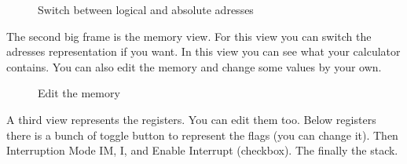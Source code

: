 \documentclass[10pt]{report}
\begin{document}
\begin{figure}[H]
\centering
{}
\caption{Switch between logical and absolute adresses}
\end{figure}
The second big frame is the memory view.\newline
For this view you can switch the adresses representation if you want.\newline
In this view you can see what your calculator contains.\newline
You can also edit the memory and change some values by your own.\newline
\begin{figure}[H]
\centering
{}
\caption{Edit the memory}
\end{figure}
A third view represents the registers.\newline
You can edit them too.\newline
Below registers there is a bunch of toggle button to represent the flags (you can change it).\newline
Then Interruption Mode IM, I, and Enable Interrupt (checkbox).\newline
The finally the stack.\newline
\end{document}
